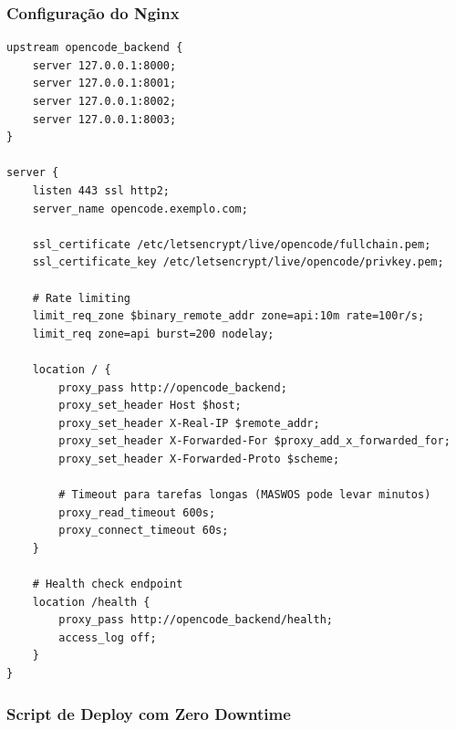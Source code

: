 \subsubsection{Configuração do Nginx}

\begin{lstlisting}[caption={Configuração Nginx para o servidor MCP},label={lst:nginx-config}]
upstream opencode_backend {
    server 127.0.0.1:8000;
    server 127.0.0.1:8001;
    server 127.0.0.1:8002;
    server 127.0.0.1:8003;
}

server {
    listen 443 ssl http2;
    server_name opencode.exemplo.com;
    
    ssl_certificate /etc/letsencrypt/live/opencode/fullchain.pem;
    ssl_certificate_key /etc/letsencrypt/live/opencode/privkey.pem;
    
    # Rate limiting
    limit_req_zone $binary_remote_addr zone=api:10m rate=100r/s;
    limit_req zone=api burst=200 nodelay;
    
    location / {
        proxy_pass http://opencode_backend;
        proxy_set_header Host $host;
        proxy_set_header X-Real-IP $remote_addr;
        proxy_set_header X-Forwarded-For $proxy_add_x_forwarded_for;
        proxy_set_header X-Forwarded-Proto $scheme;
        
        # Timeout para tarefas longas (MASWOS pode levar minutos)
        proxy_read_timeout 600s;
        proxy_connect_timeout 60s;
    }
    
    # Health check endpoint
    location /health {
        proxy_pass http://opencode_backend/health;
        access_log off;
    }
}
\end{lstlisting}

\subsubsection{Script de Deploy com Zero Downtime}

